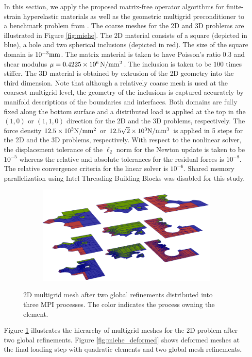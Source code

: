 \documentclass[times,doublespace]{nmeauth}
\begin{document}
In this section, we apply the proposed matrix-free operator algorithms for finite-strain hyperelastic materials as well as the geometric multigrid preconditioner to a benchmark problem from \cite{Miehe2007}. The coarse meshes for the 2D and 3D problems are illustrated in Figure \ref{fig:miehe}. The 2D material consists of a square (depicted in blue), a hole and two spherical inclusions (depicted in red). The size of the square domain is $10^{-3} \rm{mm}$.
The matrix material is taken to have Poisson's ratio $0.3$ and shear modulus $\mu=0.4225 \times 10^6\, \rm{N/mm^2}$. The inclusion is taken to be $100$ times stiffer.
The 3D material is obtained by extrusion of the 2D geometry into the third dimension.
Note that although a relatively coarse mesh is used at the coarsest multigrid level, the geometry of the inclusions is captured accurately by manifold descriptions of the boundaries and interfaces.
Both domains are fully fixed along the bottom surface and a distributed load is applied at the top in the $(1,0)$ or $(1,1,0)$ direction for the 2D and the 3D problems, respectively.
The force density $12.5 \times 10^3 \rm{N/mm^2}$ or $12.5 \sqrt{2} \times 10^3 \rm{N/mm^3}$ is applied in 5 steps for the 2D and the 3D problems, respectively.
With respect to the nonlinear solver, the displacement tolerance of the $\mathcal{\ell}_2$ norm for the Newton update is taken to be $10^{-5}$ whereas the relative and absolute tolerances for the residual forces is $10^{-8}$. The relative convergence criteria for the linear solver is $10^{-6}$.
Shared memory parallelization using Intel Threading Building Blocks was disabled for this study.


\begin{figure}[!ht]
  \centering
  \begin{subfigure}[b]{0.8\textwidth}
    \centering
    \includegraphics[width=\textwidth]{gmg_2d.png}
  \end{subfigure}
  \caption{2D multigrid mesh after two global refinements distributed into three MPI processes. The color indicates the process owning the element.}%
  \label{fig:miehe_gmg}
\end{figure}
%
Figure \ref{fig:miehe_gmg} illustrates the hierarchy of multigrid meshes for the 2D problem after two global refinements.
Figure \ref{fig:miehe_deformed} shows deformed meshes at the final loading step with quadratic elements and two global mesh refinements.
\end{document}
